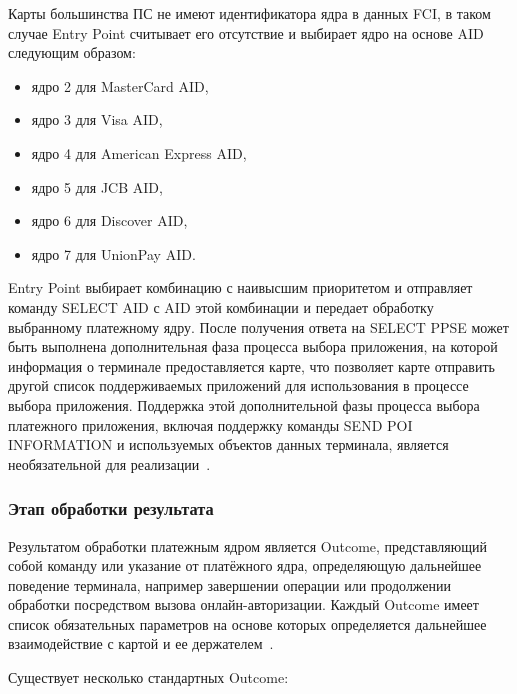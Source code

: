 Карты большинства ПС не имеют идентификатора ядра в данных FCI, в таком случае Entry Point считывает его отсутствие и выбирает ядро на основе AID следующим образом:
\begin{itemize}
    \item ядро 2 для MasterCard AID,
    \item ядро 3 для Visa AID,
    \item ядро 4 для American Express AID,
    \item ядро 5 для JCB AID,
    \item ядро 6 для Discover AID,
    \item ядро 7 для UnionPay AID.
\end{itemize}

Entry Point выбирает комбинацию с наивысшим приоритетом и отправляет команду SELECT AID с AID этой комбинации и передает обработку выбранному платежному ядру.
После получения ответа на SELECT PPSE может быть выполнена дополнительная фаза процесса выбора приложения, на которой информация о терминале предоставляется карте, что позволяет карте отправить другой список поддерживаемых приложений для использования в процессе выбора приложения.
Поддержка этой дополнительной фазы процесса выбора платежного приложения, включая поддержку команды SEND POI INFORMATION и используемых объектов данных терминала, является необязательной для реализации~\cite{emv_book_B}.

\subsubsection{Этап обработки результата}
\label{subsubsec:outcome_processing}

Результатом обработки платежным ядром является Outcome, представляющий собой команду или указание от платёжного ядра, определяющую дальнейшее поведение терминала, например завершении операции или продолжении обработки посредством вызова онлайн-авторизации.
Каждый Outcome имеет список обязательных параметров на основе которых определяется дальнейшее взаимодействие с картой и ее держателем~\cite{emv_book_A}.

Существует несколько стандартных Outcome:

